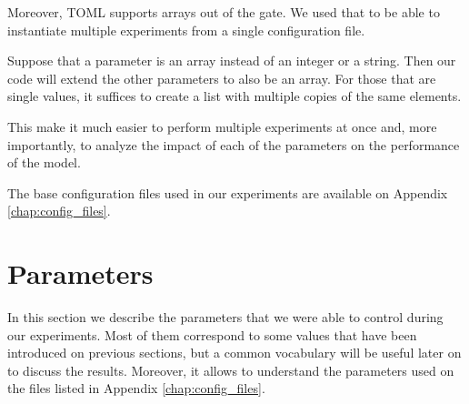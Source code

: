 Moreover, TOML supports arrays out of the gate.
We used that to be able to instantiate multiple experiments from a single configuration file.

Suppose that a parameter is an array instead of an integer or a string.
Then our code will extend the other parameters to also be an array.
For those that are single values, it suffices to create a list with multiple copies of the same elements.

This make it much easier to perform multiple experiments at once and, more importantly, to analyze the impact of each of the parameters on the performance of the model.

The base configuration files used in our experiments are available on Appendix \ref{chap:config_files}.

\section{Parameters}

In this section we describe the parameters that we were able to control during our experiments.
Most of them correspond to some values that have been introduced on previous sections, but a common vocabulary will be useful later on to discuss the results.
Moreover, it allows to understand the parameters used on the files listed in Appendix \ref{chap:config_files}.

